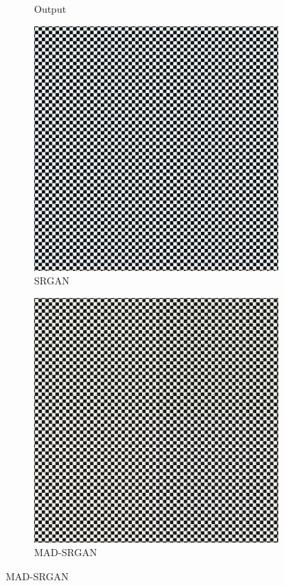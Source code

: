 \documentclass[12pt,a4paper]{article}
\begin{document}
\begin{figure}[H]
\begin{subfigure}{0.2\textwidth}
                \caption*{Output}
            \end{subfigure}
            \enspace
            \begin{subfigure}{0.2\textwidth}
                \includegraphics[width=\textwidth]{images/samples/aliasing-3-srgan.png}
                \caption*{SRGAN}
            \end{subfigure}
            \enspace
            \begin{subfigure}{0.2\textwidth}
                \includegraphics[width=\textwidth]{images/samples/aliasing-3-mad-srgan.png}
                \caption*{MAD-SRGAN}
            \end{subfigure}
        \end{figure}
\end{document}
